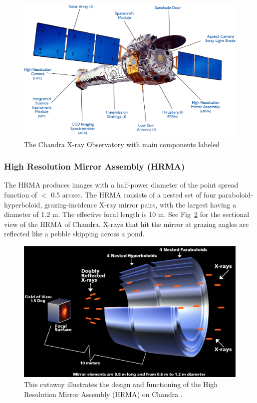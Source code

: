 \begin{figure}[ht!]
\centering
  \includegraphics[width = \linewidth]{Chapters/Figures/chandra_full.jpg}
  \caption{The Chandra X-ray Observatory with main components labeled \citep{Harbaugh2017}}
  \label{fig:chandratelescope}
\end{figure}


\subsubsection{High Resolution Mirror Assembly (HRMA)}
The HRMA produces images with a half-power diameter of the point spread function of $<$ 0.5 arcsec. The HRMA consists of a nested set of four paraboloid-hyperboloid, grazing-incidence X-ray mirror pairs, with the largest having a diameter of 1.2 m. The effective focal length is 10 m. See Fig~\ref{fig:HRMA} for the sectional view of the HRMA of Chandra. X-rays that hit the mirror at grazing angles are reflected like a pebble skipping across a pond.\par

\begin{figure}[ht]
\centering
  \includegraphics[width = \linewidth]{Chapters/Figures/paraboloid_hyperboloid_mirror.png}
  \caption{This cutaway illustrates the design and functioning of the High Resolution Mirror Assembly (HRMA) on Chandra \citep{NASA2009}.}
  \label{fig:HRMA}
\end{figure}


